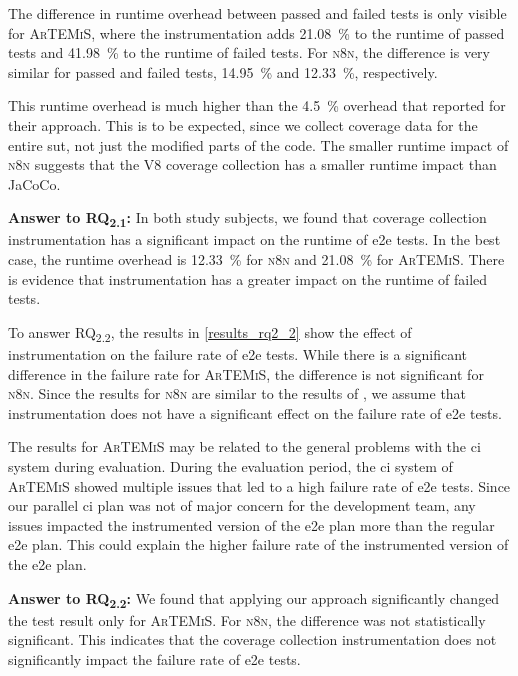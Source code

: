 The difference in runtime overhead between passed and failed tests is only visible for \textsc{ArTEMiS}, where the instrumentation adds \SI{21.08}{\percent} to the runtime of passed tests and \SI{41.98}{\percent} to the runtime of failed tests.
For \textsc{n8n}, the difference is very similar for passed and failed tests, \SI{14.95}{\percent} and \SI{12.33}{\percent}, respectively.

This runtime overhead is much higher than the \SI{4.5}{\percent} overhead that \citeauthor*{bell2018determining} reported for their approach.
This is to be expected, since we collect coverage data for the entire \ac{sut}, not just the modified parts of the code.
The smaller runtime impact of \textsc{n8n} suggests that the V8 coverage collection has a smaller runtime impact than JaCoCo.

\begin{mdframed}
	\textbf{Answer to RQ\textsubscript{2.1}:} In both study subjects, we found that coverage collection instrumentation has a significant impact on the runtime of \ac{e2e} tests.
	In the best case, the runtime overhead is \SI{12.33}{\percent} for \textsc{n8n} and \SI{21.08}{\percent} for \textsc{ArTEMiS}.
	There is evidence that instrumentation has a greater impact on the runtime of failed tests.
\end{mdframed}

To answer RQ\textsubscript{2.2}, the results in \cref{results_rq2_2} show the effect of instrumentation on the failure rate of \ac{e2e} tests.
While there is a significant difference in the failure rate for \textsc{ArTEMiS}, the difference is not significant for \textsc{n8n}.
Since the results for \textsc{n8n} are similar to the results of \citeauthor*{rasheed_effect_2023} \autocite{rasheed_effect_2023}, we assume that instrumentation does not have a significant effect on the failure rate of \ac{e2e} tests.

The results for \textsc{ArTEMiS} may be related to the general problems with the \ac{ci} system during evaluation.
During the evaluation period, the \ac{ci} system of \textsc{ArTEMiS} showed multiple issues that led to a high failure rate of \ac{e2e} tests.
Since our parallel \ac{ci} plan was not of major concern for the development team, any issues impacted the instrumented version of the \ac{e2e} plan more than the regular \ac{e2e} plan.
This could explain the higher failure rate of the instrumented version of the \ac{e2e} plan.

\begin{mdframed}
	\textbf{Answer to RQ\textsubscript{2.2}:} We found that applying our approach significantly changed the test result only for \textsc{ArTEMiS}.
	For \textsc{n8n}, the difference was not statistically significant.
	This indicates that the coverage collection instrumentation does not significantly impact the failure rate of \acs{e2e} tests.
\end{mdframed}

